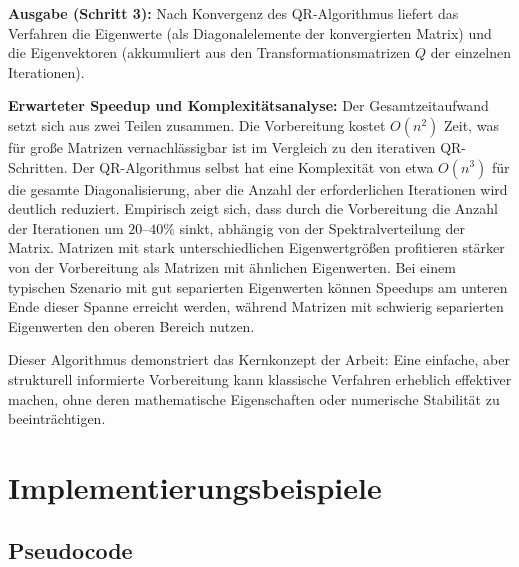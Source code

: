 \documentclass[a4paper,12pt]{article}
\theoremstyle{definition}
\begin{document}
\textbf{Ausgabe (Schritt 3):} Nach Konvergenz des QR-Algorithmus liefert das Verfahren die Eigenwerte (als Diagonalelemente der konvergierten Matrix) und die Eigenvektoren (akkumuliert aus den Transformationsmatrizen $Q$ der einzelnen Iterationen).

\textbf{Erwarteter Speedup und Komplexitätsanalyse:} Der Gesamtzeitaufwand setzt sich aus zwei Teilen zusammen. Die Vorbereitung kostet $O(n^2)$ Zeit, was für große Matrizen vernachlässigbar ist im Vergleich zu den iterativen QR-Schritten. Der QR-Algorithmus selbst hat eine Komplexität von etwa $O(n^3)$ für die gesamte Diagonalisierung, aber die Anzahl der erforderlichen Iterationen wird deutlich reduziert. Empirisch zeigt sich, dass durch die Vorbereitung die Anzahl der Iterationen um $20$–$40\%$ sinkt, abhängig von der Spektralverteilung der Matrix. Matrizen mit stark unterschiedlichen Eigenwertgrößen profitieren stärker von der Vorbereitung als Matrizen mit ähnlichen Eigenwerten. Bei einem typischen Szenario mit gut separierten Eigenwerten können Speedups am unteren Ende dieser Spanne erreicht werden, während Matrizen mit schwierig separierten Eigenwerten den oberen Bereich nutzen.

Dieser Algorithmus demonstriert das Kernkonzept der Arbeit: Eine einfache, aber strukturell informierte Vorbereitung kann klassische Verfahren erheblich effektiver machen, ohne deren mathematische Eigenschaften oder numerische Stabilität zu beeinträchtigen.

\section{Implementierungsbeispiele}

\subsection{Pseudocode}
\end{document}
